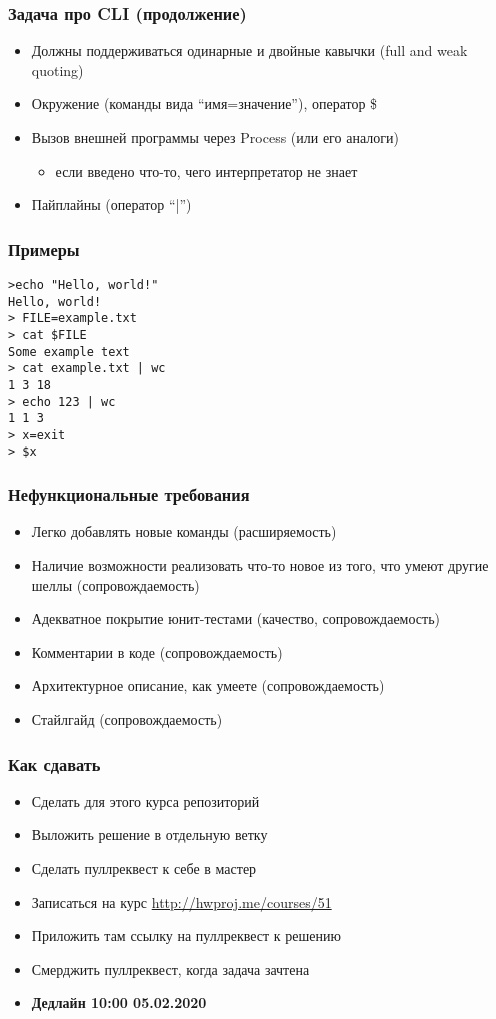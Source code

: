 \documentclass[xetex,mathserif,serif]{beamer}
\begin{document}
	\begin{frame}
		\frametitle{Задача про CLI (продолжение)}
		\begin{itemize}
			\item Должны поддерживаться одинарные и двойные кавычки (full and weak quoting)
			\item Окружение (команды вида ``имя=значение''), оператор \$
			\item Вызов внешней программы через Process (или его аналоги)
			\begin{itemize}
				\item если введено что-то, чего интерпретатор не знает
			\end{itemize}
			\item Пайплайны (оператор ``|'')
		\end{itemize}
	\end{frame}
	
	\begin{frame}[fragile]
		\frametitle{Примеры}
\begin{verbatim}
>echo "Hello, world!"
Hello, world!
> FILE=example.txt
> cat $FILE
Some example text
> cat example.txt | wc
1 3 18
> echo 123 | wc
1 1 3
> x=exit
> $x
\end{verbatim}
\end{frame}

	\begin{frame}
		\frametitle{Нефункциональные требования}
		\begin{itemize}
			\item Легко добавлять новые команды (расширяемость)
			\item Наличие возможности реализовать что-то новое из того, что умеют другие шеллы (сопровождаемость)
			\item Адекватное покрытие юнит-тестами (качество, сопровождаемость)
			\item Комментарии в коде (сопровождаемость)
			\item Архитектурное описание, как умеете (сопровождаемость)
			\item Стайлгайд (сопровождаемость)
		\end{itemize}
	\end{frame}
	
	\begin{frame}
		\frametitle{Как сдавать}
		\begin{itemize}
			\item Сделать для этого курса репозиторий
			\item Выложить решение в отдельную ветку
			\item Сделать пуллреквест к себе в мастер
			\item Записаться на курс \url{http://hwproj.me/courses/51}
			\item Приложить там ссылку на пуллреквест к решению
			\item Смерджить пуллреквест, когда задача зачтена
			\item \textbf{Дедлайн 10:00 05.02.2020}
		\end{itemize}
	\end{frame}
	
\end{document}
